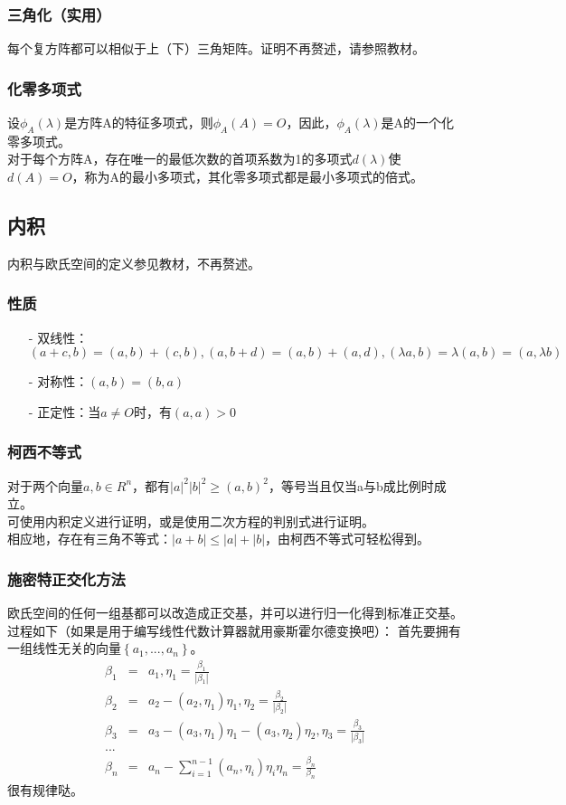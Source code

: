 \documentclass[UTF8]{ctexart}
\begin{document}
	\subsubsection{三角化（实用）}
	每个复方阵都可以相似于上（下）三角矩阵。证明不再赘述，请参照教材。
	\subsubsection{化零多项式}
	设$\phi_{A}(\lambda)$是方阵A的特征多项式，则$\phi_{A}(A)=\mathit{O}$，因此，$\phi_{A}(\lambda)$是A的一个化零多项式。\\
	\indent
	对于每个方阵A，存在唯一的最低次数的首项系数为1的多项式$d(\lambda)$使$d(A)=\mathit{O}$，称为A的最小多项式，其化零多项式都是最小多项式的倍式。
	\subsection{内积}
	内积与欧氏空间的定义参见教材，不再赘述。
	\subsubsection{性质}
	\begin{itemize}
		\item[-]双线性：$(a+c,b)=(a,b)+(c,b),(a,b+d)=(a,b)+(a,d),(\lambda a,b)=\lambda(a,b)=(a,\lambda b)$
		\item[-]对称性：$(a,b)=(b,a)$
		\item[-]正定性：当$a\neq \mathit{O}$时，有$(a,a)>0$
	\end{itemize}
	\subsubsection{柯西不等式}
	对于两个向量$a,b\in R^{n}$，都有$|a|^{2}|b|^{2}\geq(a,b)^{2}$，等号当且仅当a与b成比例时成立。\\
	\indent
	可使用内积定义进行证明，或是使用二次方程的判别式进行证明。\\
	\indent
	相应地，存在有三角不等式：$|a+b|\leq|a|+|b|$，由柯西不等式可轻松得到。
	\subsubsection{施密特正交化方法}
	欧氏空间的任何一组基都可以改造成正交基，并可以进行归一化得到标准正交基。
	过程如下（如果是用于编写线性代数计算器就用豪斯霍尔德变换吧）：
	首先要拥有一组线性无关的向量$\left\{a_1,...,a_n\right\}$。
	\begin{eqnarray*}
		\beta_{1}&=&a_1, \eta_{1}  = \frac{\beta_{1}}{|\beta_{1}|} \\
		\beta_{2}&=&a_2-(a_2,\eta_1)\eta_1, \eta_2=\frac{\beta_{2}}{|\beta_{2}|}\\
		\beta_{3}&=&a_3-(a_3,\eta_1)\eta_1-(a_3,\eta_2)\eta_2, \eta_3 = \frac{\beta_{3}}{|\beta_{3}|}\\
		...\\
		\displaystyle \beta_{n}&=&a_n-\sum^{n-1}_{i=1}(a_n,\eta_i)\eta_i \eta_n= \frac{\beta_{n}}{\beta_{n}}
	\end{eqnarray*}
	很有规律哒。
\end{document}
